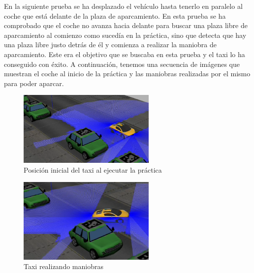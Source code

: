 En la siguiente prueba se ha desplazado el vehículo hasta tenerlo en paralelo al coche que está delante de la plaza de aparcamiento. En esta prueba se ha comprobado que el coche no avanza hacia delante para buscar una plaza libre de aparcamiento al comienzo como sucedía en la práctica, sino que detecta que hay una plaza libre justo detrás de él y comienza a realizar la maniobra de aparcamiento. Este era el objetivo que se buscaba en esta prueba y el taxi lo ha conseguido con éxito. A continuación, tenemos una secuencia de imágenes que muestran el coche al inicio de la práctica y las maniobras realizadas por el mismo para poder aparcar.

\begin{figure}[H]
  \begin{center}
    \includegraphics[width=0.6\textwidth]{figures/Autopark/Experimento2_1.png}
		\caption{Posición inicial del taxi al ejecutar la práctica}
		\label{fig.Experimento2_1}
		\end{center}
\end{figure}

\begin{figure}[H]
  \begin{center}
    \includegraphics[width=0.6\textwidth]{figures/Autopark/Experimento2_2.png}
		\caption{Taxi realizando maniobras}
		\label{fig.Experimento2_2}
		\end{center}
\end{figure}

